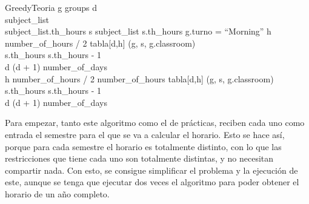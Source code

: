 \begin{pseudocode}{GreedyTeoria}{ }
    \label{greedyteoria}
    \FOREACH g \in groups \DO
    \BEGIN
        d  \\
        subject\_list \GETS {}\\
        \WHILE \sum subject\_list.th\_hours  \DO
        \BEGIN
            \FOREACH s \in subject\_list \DO
            \BEGIN
                \IF s.th\_hours  \DO
                \BEGIN
                    \IF g.turno = ``Morning'' \DO
                    \BEGIN
                        \FOR h  \TO number\_of\_hours / 2 \DO
                        \BEGIN
                            \IF {} \DO
                            \BEGIN
                                tabla[d,h] \GETS (g, s, g.classroom)\\
                                s.th\_hours \GETS s.th\_hours - 1\\
                                d \GETS (d + 1) \bmod number\_of\_days\\
                                \BREAK
                            \END
                        \END
                    \END
                    \ELSE \DO
                    \BEGIN
                        \FOR h \GETS number\_of\_hours / 2 \TO number\_of\_hours \DO
                        \BEGIN
                            \IF {} \DO
                            \BEGIN
                                tabla[d,h] \GETS (g, s, g.classroom)\\
                                s.th\_hours \GETS s.th\_hours - 1\\
                                d \GETS (d + 1) \bmod number\_of\_days\\
                                \BREAK
                            \END
                        \END
                    \END
                \END
            \END
        \END
    \END
\end{pseudocode}

Para empezar, tanto este algoritmo como el de prácticas, reciben cada uno como entrada el semestre para el que se va a calcular el horario. Esto se hace así, porque para cada semestre el horario es totalmente distinto, con lo que las restricciones que tiene cada uno son totalmente distintas, y no necesitan compartir nada. Con esto, se consigue simplificar el problema y la ejecución de este, aunque se tenga que ejecutar dos veces el algoritmo para poder obtener el horario de un año completo.

